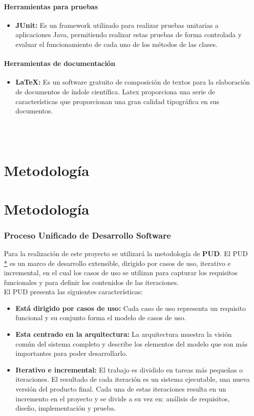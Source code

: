 \documentclass[12pt, a4paper]{article}
\newcommand*\parttitle{}
\let\origpart\part
\renewcommand*{\part}[2][]{%
	\ifx\\#1\\%
	\origpart{#2}%
	\renewcommand*\parttitle{#2}%
	\else
	\origpart[#1]{#2}%
	\renewcommand*\parttitle{#1}%
	\fi
}
\begin{document}
\subsection{Herramientas para pruebas}
\begin{itemize}
	\item \textbf{JUnit: }Es un framework utilizado para realizar pruebas unitarias a aplicaciones Java, permitiendo realizar estas pruebas de forma controlada y evaluar el funcionamiento de cada uno de los métodos de las clases.
\end{itemize}

\subsection{Herramientas de documentación}

\begin{itemize}
	\item \textbf{LaTeX: }Es un software gratuito de composición de textos para la elaboración de documentos de índole científica. Latex proporciona una serie de características que proporcionan una gran calidad tipográfica en sus documentos.
\end{itemize}



\newpage



\part{Metodología}

\section{Proceso Unificado de Desarrollo Software}
Para la realización de este proyecto se utilizará la metodología de \textbf{ \gls{PUD}}. El \gls{PUD} \href{https://es.wikipedia.org/wiki/Proceso_unificado}{*} es un marco de desarrollo extensible, dirigido por casos de uso, iterativo e incremental, en el cual los casos de uso se utilizan para capturar los requisitos funcionales y para definir los contenidos de las iteraciones.\\

El \gls{PUD} presenta las siguientes características:

\begin{itemize}
	\item \textbf{Está dirigido por casos de uso:} Cada caso de uso representa un requisito funcional y su conjunto forma el modelo de casos de uso.
	\item \textbf{Esta centrado en la arquitectura:} La arquitectura muestra la visión común del sistema completo y describe los elementos del modelo que son más importantes para poder desarrollarlo.
	\item \textbf{Iterativo e incremental: } El trabajo es dividido en tareas más pequeñas o iteraciones. El resultado de cada iteración es un sistema ejecutable, una nueva versión del producto final. Cada una de estas iteraciones resulta en un incremento en el proyecto y se divide a su vez en: análisis de requisitos, diseño, implementación y prueba.
\end{itemize}
\end{document}
